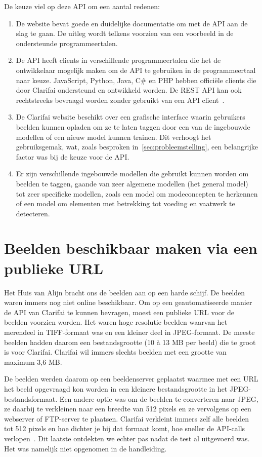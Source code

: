 De keuze viel op deze API om een aantal redenen:
\begin{enumerate}
	\item De website bevat goede en duidelijke documentatie om met de API aan de slag te gaan. De uitleg wordt telkens voorzien van een voorbeeld in de ondersteunde programmeertalen.
	\item De API heeft clients in verschillende programmeertalen die het de ontwikkelaar mogelijk maken om de API te gebruiken in de programmeertaal naar keuze. JavaScript, Python, Java, C\# en PHP hebben officiële clients die door Clarifai ondersteund en ontwikkeld worden. De REST API kan ook rechtstreeks bevraagd worden zonder gebruikt van een API client~\autocite{ClarifaiAPI}.
	\item De Clarifai website beschikt over een grafische interface waarin gebruikers beelden kunnen opladen om ze te laten taggen door een van de ingebouwde modellen of een nieuw model kunnen trainen. Dit verhoogt het gebruiksgemak, wat, zoals besproken in~\ref{sec:probleemstelling}, een belangrijke factor was bij de keuze voor de API.
	\item Er zijn verschillende ingebouwde modellen die gebruikt kunnen worden om beelden te taggen, gaande van zeer algemene modellen (het general model) tot zeer specifieke modellen, zoals een model om modeconcepten te herkennen of een model om elementen met betrekking tot voeding en vaatwerk te detecteren.
\end{enumerate}

\section{Beelden beschikbaar maken via een publieke URL}
\label{sec:beelden-via-URL}

Het Huis van Alijn bracht ons de beelden aan op een harde schijf. De beelden waren immers nog niet online beschikbaar. Om op een geautomatiseerde manier de API van Clarifai te kunnen bevragen, moest een publieke URL voor de beelden voorzien worden. Het waren hoge resolutie beelden waarvan het merendeel in TIFF-formaat was en een kleiner deel in JPEG-formaat. De meeste beelden hadden daarom een bestandsgrootte (10 à 13 MB per beeld) die te groot is voor Clarifai. Clarifai wil immers slechts beelden met een grootte van maximum 3,6 MB. 

De beelden werden daarom op een beeldenserver geplaatst waarmee met een URL het beeld opgevraagd kon worden in een kleinere bestandsgrootte in het JPEG-bestandsformaat. Een andere optie was om de beelden te converteren naar JPEG, ze daarbij te verkleinen naar een breedte van 512 pixels en ze vervolgens op een webserver of FTP-server te plaatsen. Clarifai verkleint immers zelf alle beelden tot 512 pixels en hoe dichter je bij dat formaat komt, hoe sneller de API-calls verlopen~\autocite{Clairbot2019}. Dit laatste ontdekten we echter pas nadat de test al uitgevoerd was. Het was namelijk niet opgenomen in de handleiding.

